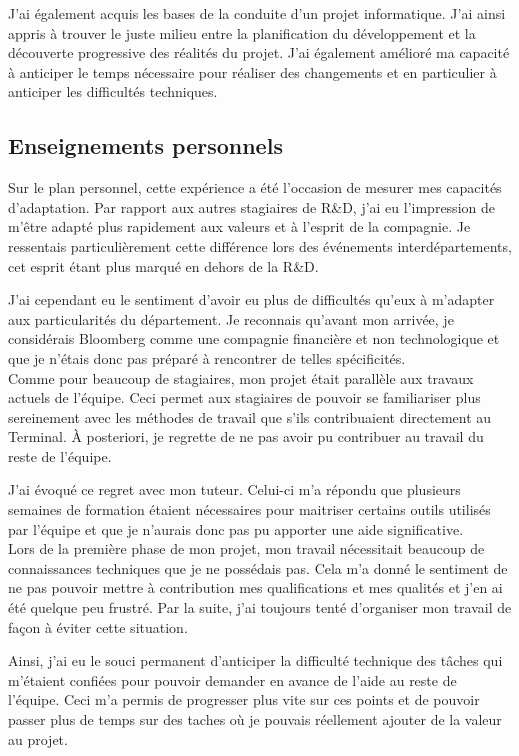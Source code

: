 \documentclass[11pt, oneside, titlepage, a4paper]{article}
\begin{document}
J'ai également acquis les bases de la conduite d'un projet informatique. J'ai ainsi appris à trouver le juste milieu entre la planification du développement et la découverte progressive des réalités du projet. J'ai également amélioré ma capacité à anticiper le temps nécessaire pour réaliser des changements et en particulier à anticiper les difficultés techniques.
	\subsection{Enseignements personnels} \label{ensperso}
Sur le plan personnel, cette expérience a été l'occasion de mesurer mes capacités d'adaptation. Par rapport aux autres stagiaires de R\&D, j'ai eu l'impression de m'être adapté plus rapidement aux valeurs et à l'esprit de la compagnie. Je ressentais particulièrement cette différence lors des événements interdépartements, cet esprit étant plus marqué en dehors de la R\&D.

J'ai cependant eu le sentiment d'avoir eu plus de difficultés qu'eux à m'adapter aux particularités du département. Je reconnais qu'avant mon arrivée, je considérais Bloomberg comme une compagnie financière et non technologique et que je n'étais donc pas préparé à rencontrer de telles spécificités.
\\

Comme pour beaucoup de stagiaires, mon projet était parallèle aux travaux actuels de l'équipe. Ceci permet aux stagiaires de pouvoir se familiariser plus sereinement avec les méthodes de travail que s'ils contribuaient directement au Terminal. À posteriori, je regrette de ne pas avoir pu contribuer au travail du reste de l'équipe.

J'ai évoqué ce regret avec mon tuteur. Celui-ci m'a répondu que plusieurs semaines de formation étaient nécessaires pour maitriser certains outils utilisés par l'équipe et que je n'aurais donc pas pu apporter une aide significative.
\\

Lors de la première phase de mon projet, mon travail nécessitait beaucoup de connaissances techniques que je ne possédais pas. Cela m'a donné le sentiment de ne pas pouvoir mettre à contribution mes qualifications et mes qualités et j'en ai été quelque peu frustré. Par la suite, j'ai toujours tenté d'organiser mon travail de façon à éviter cette situation.

Ainsi, j'ai eu le souci permanent d'anticiper la difficulté technique des tâches qui m'étaient confiées pour pouvoir demander en avance de l'aide au reste de l'équipe. Ceci m'a permis de progresser plus vite sur ces points et de pouvoir passer plus de temps sur des taches où je pouvais réellement ajouter de la valeur au projet.
\\
\end{document}
